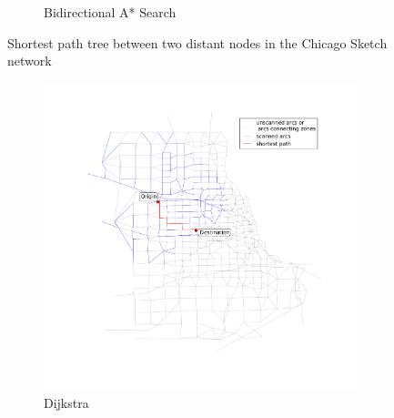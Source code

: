 \begin{figure}
\begin{subfigure}{.5\textwidth}
        \caption{Bidirectional A* Search}
        \label{fig:chicago_astar_bidirect}
    \end{subfigure}
    \vspace{1em}
    \caption{Shortest path tree between two distant nodes in the Chicago Sketch network}
    \label{fig:long_sptree}
\end{figure}

\begin{figure}
    \centering
    \begin{subfigure}{.5\textwidth}
        \centering
        \includegraphics[width=\textwidth,trim=120px 120px 48px 120px,clip]{img/chicago_dijkstra2}
        \caption{Dijkstra}
        \label{fig:chicago_dijkstra2}
    \end{subfigure}%
    \begin{subfigure}{.5\textwidth}
        \centering

\end{subfigure}
\end{figure}
